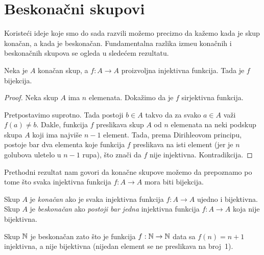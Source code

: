 \section{Beskona\v cni skupovi}

Koriste\'ci ideje koje smo do sada razvili mo\v zemo precizno da ka\v zemo kada je skup kona\v can,
a kada je beskona\v can. Fundamentalna razlika izme\dj u kona\v cnih i beskona\v cnih skupova se
ogleda u slede\'cem rezultatu.

\begin{THM}
  Neka je $A$ kona\v can skup, a $f : A \to A$ proizvoljna injektivna funkcija.
  Tada je $f$ bijekcija.
\end{THM}
\begin{proof}
  Neka skup $A$ ima $n$ elemenata.
  Doka\v zimo da je $f$ sirjektivna funkcija.
  
  Pretpostavimo suprotno. Tada postoji $b \in A$ takvo da za svako $a \in A$ va\v zi $f(a) \ne b$. 
  Dakle, funkcija $f$ preslikava skup $A$ od $n$ elemenata na neki podskup skupa $A$ koji ima najvi\v se $n-1$
  element. Tada, prema Dirihleovom principu, postoje bar dva elementa koje funkcija $f$ preslikava na isti element
  (jer je $n$ golubova uletelo u $n-1$ rupa), \v sto zna\v ci da $f$ nije injektivna. Kontradikcija.
\end{proof}

Prethodni rezultat nam govori da kona\v cne skupove mo\v zemo da prepoznamo po tome \v sto
svaka injektivna funkcija $f : A \to A$ mora biti bijekcija.

\begin{DEF}
  Skup $A$ je \emph{kona\v can} ako je svaka injektivna funkcija $f : A \to A$ ujedno i bijektivna.
  Skup $A$ je \emph{beskona\v can} ako \emph{postoji bar jedna}
  injektivna funkcija $f : A \to A$ koja nije bijektivna.
\end{DEF}

\begin{EX}
  Skup $\mathbb{N}$ je beskona\v can zato \v sto je funkcija $f : \mathbb{N} \to \mathbb{N}$ data sa $f(n) = n + 1$ injektivna, a nije
  bijektivna (nijedan element se ne preslikava na broj~1).
\end{EX}

